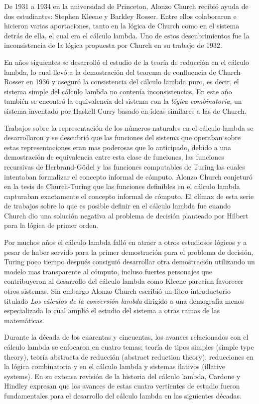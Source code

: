 De 1931 a 1934 en la universidad de Princeton, Alonzo Church recibió
ayuda de dos estudiantes: Stephen Kleene y Barkley Rosser. Entre ellos
colaboraron e hicieron varias aportaciones, tanto en la lógica de Church como en
el sistema detrás de ella, el cual era el cálculo lambda. Uno de estos descubrimientos
fue la inconsistencia de la lógica propuesta por Church en su trabajo
de 1932.\

En años siguientes se desarrolló el estudio de la teoría de reducción
en el cálculo lambda, lo cual llevó a la demostración del teorema de
confluencia de Church-Rosser en 1936 y aseguró la consistencia del
cálculo lambda puro, es decir, el sistema simple del cálculo lambda no contenía
inconsistencias. En este año también se encontró la equivalencia del
sistema con la \emph{lógica combinatoria}, un sistema inventado por
Haskell Curry basado en ideas similares a las de Church.\

Trabajos sobre la representación de los números naturales en el cálculo lambda
se desarrollaron y se descubrió que las funciones del sistema que
operaban sobre estas representaciones eran mas poderosas que lo
anticipado, debido a una demostración de equivalencia entre esta clase
de funciones, las funciones recursivas de Herbrand-Gödel y las
funciones computables de Turing las cuales intentaban formalizar el
concepto informal de cómputo. Alonzo Church conjeturó en la tesis de
Church-Turing que las funciones definibles en el cálculo lambda capturaban
exactamente el concepto informal de cómputo. El clímax de esta serie
de trabajos sobre lo que es posible definir en el cálculo lambda fue cuando
Church dio una solución negativa al problema de decisión planteado por
Hilbert para la lógica de primer orden.\

Por muchos años el cálculo lambda falló en atraer a otros estudiosos lógicos y
a pesar de haber servido para la primer demostración para
el problema de decisión, Turing poco tiempo después consiguió
desarrollar otra demostración utilizando un modelo mas transparente al
cómputo, incluso fuertes personajes que contribuyeron al desarrollo
del cálculo lambda como Kleene parecían favorecer otros sistemas. Sin embargo
Alonzo Church escribió un libro introductorio titulado \emph{Los
  cálculos de la conversión lambda} dirigido a una demografía menos
especializada lo cual amplió el estudio del sistema a otras ramas de
las matemáticas.\

Durante la década de los cuarentas y cincuentas, los avances
relacionados con el cálculo lambda se enfocaron en cuatro temas: teoría de
tipos simples (simple type theory), teoría abstracta de reducción
(abstract reduction theory), reducciones en la lógica
combinatoria y en el cálculo lambda y sistemas ilativos (illative systems). En
su extensa revisión de la historia del cálculo lambda, Cardone y Hindley
expresan que  los avances de estas cuatro vertientes de estudio fueron
fundamentales para el desarrollo del cálculo lambda en las siguientes
décadas.\

